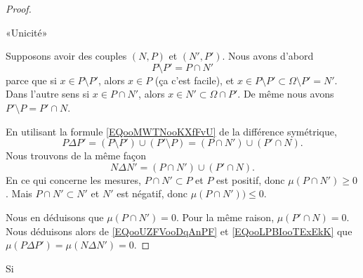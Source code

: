 \begin{proof}
	\begin{center}
		«Unicité»
	\end{center}

	Supposons avoir des couples \( (N,P)\) et \( (N',P')\). Nous avons d'abord
	\begin{equation}
		P\setminus P'=P\cap N'
	\end{equation}
	parce que si \( x\in P\setminus P'\), alors \( x\in P\) (ça c'est facile), et \( x\in P\setminus P'\subset \Omega\setminus P'=N'\). Dans l'autre sens si \( x\in P\cap N'\), alors \( x\in N'\subset\Omega\cap P'\). De même nous avons \( P'\setminus P=P'\cap N\).

	En utilisant la formule \eqref{EQooMWTNooKXfFvU} de la différence symétrique,
	\begin{equation}		\label{EQooUZFVooDqAnPF}
		P\Delta P'=(P\setminus P')\cup (P'\setminus P)=(P\cap N')\cup(P'\cap N).
	\end{equation}
	Nous trouvons de la même façon
	\begin{equation}		\label{EQooLPBIooTExEkK}
		N\Delta N'=(P\cap N')\cup(P'\cap N).
	\end{equation}
	En ce qui concerne les mesures, \( P\cap N'\subset P\) et \( P\) est positif, donc \(\mu(P\cap N')\geq 0 \). Mais \( P\cap N'\subset N'\) et \( N'\) est négatif, donc \( \mu(P\cap N'))\leq 0\).

	Nous en déduisons que \( \mu(P\cap N')=0\). Pour la même raison, \( \mu(P'\cap N)=0 \). Nous déduisons alors de \eqref{EQooUZFVooDqAnPF} et \eqref{EQooLPBIooTExEkK} que \( \mu(P\Delta P')=\mu(N\Delta N')=0\).
\end{proof}

\begin{proposition}
	Si
\end{proposition}


